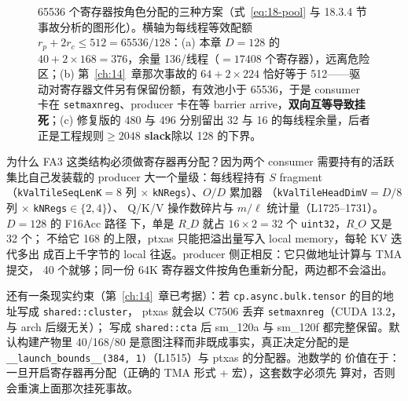 \begin{figure}[H]
\caption{65536 个寄存器按角色分配的三种方案（式~\ref{eq:18-pool} 与 18.3.4 节事故分析的图形化）。横轴为每线程等效配额 $r_p + 2r_c \le 512 = 65536/128$：(a) 本章 $D{=}128$ 的 $40+2\times168=376$，余量 136/线程（$=17408$ 个寄存器），远离危险区；(b) 第~\ref{ch:14}~章那次事故的 $64+2\times224$ 恰好等于 512——驱动对寄存器文件另有保留份额，有效池小于 65536，于是 consumer 卡在 \texttt{setmaxnreg}、producer 卡在等 barrier arrive，\textbf{双向互等导致挂死}；(c) 修复版的 480 与 496 分别留出 32 与 16 的每线程余量，后者正是工程规则\textbf{$\ge 2048$ slack}除以 128 的下界。}
\label{fig:18-reg-pool}
\end{figure}

为什么 FA3 这类结构必须做寄存器再分配？因为两个 consumer 需要持有的活跃
集比自己发装载的 producer 大一个量级：每线程持有 $S$ fragment
（\texttt{k\allowbreak{}Val\allowbreak{}Tile\allowbreak{}Seq\allowbreak{}Len\allowbreak{}K}$=8$ 列 $\times$ \texttt{kNRegs}）、$O/D$ 累加器
（\texttt{k\allowbreak{}Val\allowbreak{}Tile\allowbreak{}Head\allowbreak{}Dim\allowbreak{}V}$= D/8$ 列 $\times$ \texttt{kNRegs}$\in\{2,4\}$）、
Q/K/V 操作数碎片与 $m/\ell$ 统计量（L1725--1731）。$D{=}128$ 的 F16Acc 路径
下，单是 $R\_D$ 就占 $16 \times 2 = 32$ 个 \texttt{uint32}，$R\_O$ 又是 32 个；
不给它 168 的上限，ptxas 只能把溢出量写入 local memory，每轮 KV 迭代多出
成百上千字节的 local 往返。producer 侧正相反：它只做地址计算与 TMA 提交，
40 个就够；同一份 64K 寄存器文件按角色重新分配，两边都不会溢出。

还有一条现实约束（第~\ref{ch:14}~章已考据）：若
\texttt{cp.\allowbreak{}async.\allowbreak{}bulk.\allowbreak{}tensor} 的目的地址写成 \texttt{shared::cluster}，
ptxas 就会以 C7506 丢弃 \texttt{setmaxnreg}（CUDA 13.2，与 arch 后缀无关）；
写成 \texttt{shared::cta} 后 sm\_120a 与 sm\_120f 都完整保留。默认构建产物里
40/168/80 是意图注释而非既成事实，真正决定分配的是
\texttt{\_\allowbreak{}\_\allowbreak{}launch\_\allowbreak{}bounds\_\allowbreak{}\_\allowbreak{}(384,\allowbreak{} 1)}（L1515）与 ptxas 的分配器。池数学的
价值在于：一旦开启寄存器再分配（正确的 TMA 形式 + 宏），这套数字必须先
算对，否则会重演上面那次挂死事故。


